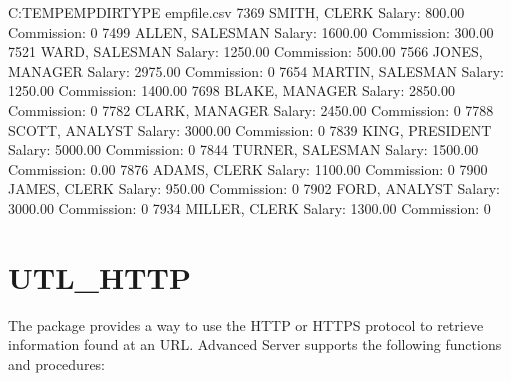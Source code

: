 \documentclass[letterpaper,10pt,english,openany,oneside]{sphinxmanual}
\begin{document}
%
\begin{sphinxVerbatim}[commandchars=\\\{\}]
C:\PYGZbs{}TEMP\PYGZbs{}EMPDIR\PYGZgt{}TYPE empfile.csv
7369 SMITH, CLERK
Salary: \PYGZdl{}800.00 Commission: \PYGZdl{}0
7499 ALLEN, SALESMAN
Salary: \PYGZdl{}1600.00 Commission: \PYGZdl{}300.00
7521 WARD, SALESMAN
Salary: \PYGZdl{}1250.00 Commission: \PYGZdl{}500.00
7566 JONES, MANAGER
Salary: \PYGZdl{}2975.00 Commission: \PYGZdl{}0
7654 MARTIN, SALESMAN
Salary: \PYGZdl{}1250.00 Commission: \PYGZdl{}1400.00
7698 BLAKE, MANAGER
Salary: \PYGZdl{}2850.00 Commission: \PYGZdl{}0
7782 CLARK, MANAGER
Salary: \PYGZdl{}2450.00 Commission: \PYGZdl{}0
7788 SCOTT, ANALYST
Salary: \PYGZdl{}3000.00 Commission: \PYGZdl{}0
7839 KING, PRESIDENT
Salary: \PYGZdl{}5000.00 Commission: \PYGZdl{}0
7844 TURNER, SALESMAN
Salary: \PYGZdl{}1500.00 Commission: \PYGZdl{}0.00
7876 ADAMS, CLERK
Salary: \PYGZdl{}1100.00 Commission: \PYGZdl{}0
7900 JAMES, CLERK
Salary: \PYGZdl{}950.00 Commission: \PYGZdl{}0
7902 FORD, ANALYST
Salary: \PYGZdl{}3000.00 Commission: \PYGZdl{}0
7934 MILLER, CLERK
Salary: \PYGZdl{}1300.00 Commission: \PYGZdl{}0
\end{sphinxVerbatim}

\newpage


\section{UTL\_HTTP}
\label{\detokenize{utl_http::doc}}\label{\detokenize{utl_http:utl-http}}
The  package provides a way to use the HTTP or HTTPS protocol
to retrieve information found at an URL. Advanced Server supports the
following functions and procedures:
\end{document}
